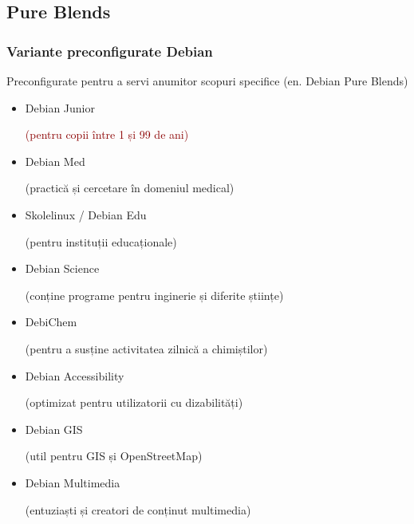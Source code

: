 \documentclass[xcolor=dvipsnames]{beamer}
\begin{document}
%
\subsection{Pure Blends}
\begin{frame}
\frametitle{Variante preconfigurate Debian}
\begin{block}
{Preconfigurate pentru a servi anumitor scopuri specifice}
(en. Debian Pure Blends)\\
\begin{itemize}
\item Debian Junior
	\begin{footnotesize}
		\textcolor{darkred}{(pentru copii între 1 și 99 de ani)}
	\end{footnotesize} 
\item \textcolor{fade}{Debian Med}
	\begin{footnotesize}
		\textcolor{fade}{(practică și cercetare în domeniul medical)}
	\end{footnotesize} 
\item \textcolor{fade}{Skolelinux / Debian Edu}
	\begin{footnotesize}
		\textcolor{fade}{(pentru instituții educaționale)}
	\end{footnotesize} 
\item \textcolor{fade}{Debian Science}
	\begin{footnotesize}
		\textcolor{fade}{(conține programe pentru inginerie și diferite științe)}
	\end{footnotesize} 
\item \textcolor{fade}{DebiChem}
	\begin{footnotesize}
		\textcolor{fade}{(pentru a susține activitatea zilnică a chimiștilor)}
	\end{footnotesize} 
\item \textcolor{fade}{Debian Accessibility}
	\begin{footnotesize}
		\textcolor{fade}{(optimizat pentru utilizatorii cu dizabilități)}
	\end{footnotesize} 
\item \textcolor{fade}{Debian GIS}
	\begin{footnotesize}
		\textcolor{fade}{(util pentru GIS și OpenStreetMap)}
	\end{footnotesize} 
\item \textcolor{fade}{Debian Multimedia}
	\begin{footnotesize}
		\textcolor{fade}{(entuziaști și creatori de conținut multimedia)}
	\end{footnotesize} 
\end{itemize}
\end{block}
\end{frame}
\end{document}
